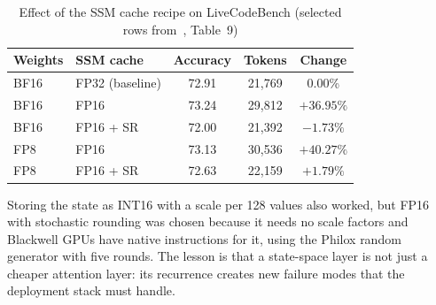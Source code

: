 \begin{table}[!htbp]
\centering
\small
\caption[Effect of the SSM cache recipe on accuracy and verbosity]{Effect of
the SSM cache recipe on LiveCodeBench (selected rows
from~\cite{nvidia2026super}, Table~9)}
\label{tab:ssm-cache}
\begin{tabular}{@{}llccc@{}}
\toprule
\textbf{Weights} & \textbf{SSM cache} & \textbf{Accuracy} & \textbf{Tokens} & \textbf{Change} \\
\midrule
BF16 & FP32 (baseline) & 72.91 & 21{,}769 & 0.00\% \\
BF16 & FP16 & 73.24 & 29{,}812 & $+36.95\%$ \\
BF16 & FP16 + SR & 72.00 & 21{,}392 & $-1.73\%$ \\
FP8  & FP16 & 73.13 & 30{,}536 & $+40.27\%$ \\
FP8  & FP16 + SR & 72.63 & 22{,}159 & $+1.79\%$ \\
\bottomrule
\end{tabular}
\end{table}

Storing the state as INT16 with a scale per 128 values also worked, but FP16
with stochastic rounding was chosen because it needs no scale factors and
Blackwell GPUs have native instructions for it, using the Philox random
generator with five rounds. The lesson is that a state-space layer is not just
a cheaper attention layer: its recurrence creates new failure modes that the
deployment stack must handle.
